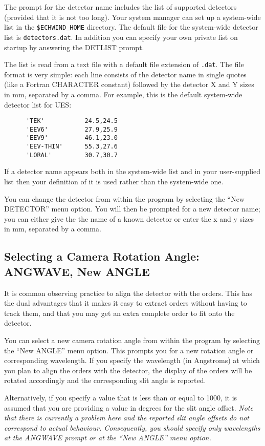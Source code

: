 \documentclass[11pt]{article}
\begin{document}
The prompt for the detector name includes the list of supported detectors
(provided that it is not too long). Your system manager can set up a
system-wide list in the {\tt \$ECHWIND\_HOME} directory.
The default file for the system-wide detector list is {\tt detectors.dat}.
In addition you can specify your own private list on
startup by answering the DETLIST prompt.

The list is read from a text file with a default file extension of {\tt .dat}.
The file format is very simple: each line
consists of the detector name in single quotes (like a Fortran CHARACTER
constant) followed by the detector X and Y sizes in mm, separated by a
comma. For example, this is the default system-wide detector list for UES:
\begin{verbatim}
      'TEK'           24.5,24.5
      'EEV6'          27.9,25.9
      'EEV9'          46.1,23.0
      'EEV-THIN'      55.3,27.6
      'LORAL'         30.7,30.7
\end{verbatim}
If a detector name appears both in the system-wide list and in your
user-supplied list then your definition of it is used rather than the
system-wide one.

You can change the detector from within the program by selecting the ``New
DETECTOR'' menu option. You will then be prompted for a new detector name;
you can either give the the name of a known detector or enter the x and y
sizes in mm, separated by a comma.

\subsection{Selecting a Camera Rotation Angle: ANGWAVE, New ANGLE}

It is common observing practice  to align the detector with the orders.
This has the dual advantages that it makes it easy to extract orders
without having to track them, and that you may get an extra complete order
to fit onto the detector.

You can select a new camera rotation angle from within the program by selecting
the ``New ANGLE'' menu option. This prompts you for a new rotation
angle or corresponding wavelength. If you specify the wavelength (in
Angstroms) at which you plan to align the orders with the detector, the
display of the orders will be rotated accordingly and the corresponding
slit angle is reported.

Alternatively, if you specify a value that is less than or equal to 1000,
it is assumed that you are providing a value in degrees for the slit angle
offset. {\em Note that there is currently a problem here and the reported
slit angle offsets do not correspond to actual behaviour. Consequently, you
should specify only wavelengths at the ANGWAVE prompt or at the ``New
ANGLE'' menu option.}
\end{document}
